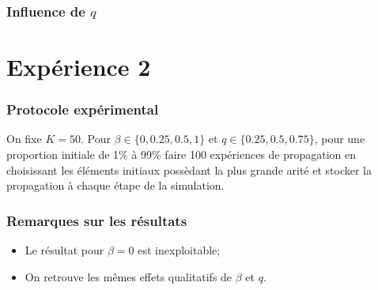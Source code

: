 \documentclass{beamer}
\begin{document}
\begin{frame}
  \frametitle{Influence de $q$}
\end{frame}

\section{Expérience 2}
\begin{frame}
  \frametitle{Protocole expérimental}
  On fixe $K=50$.
  Pour $\beta \in \{0,0.25,0.5,1\}$ et $q\in \{0.25, 0.5, 0.75\}$, pour une proportion initiale de 1\% à 99\% faire 100 expériences de propagation en choisissant les éléments initiaux possèdant la plus grande arité et stocker la propagation à chaque étape de la simulation.
\end{frame}
\begin{frame}
  \frametitle{Remarques sur les résultats}
  \begin{itemize}
    \item<1-> Le résultat pour $\beta=0$ est inexploitable;
    \item<2-> On retrouve les mêmes effets qualitatifs de $\beta$ et $q$.
  \end{itemize}
\end{frame}
\end{document}

